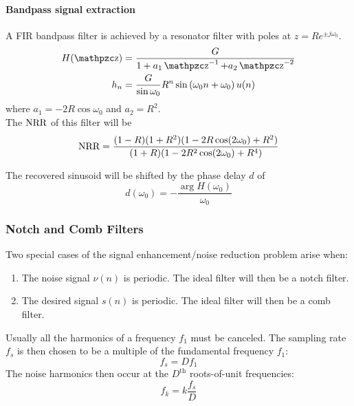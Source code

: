\paragraph{Bandpass signal extraction}
A FIR bandpass filter is achieved by a resonator filter with poles at $z = R e^{\pm j \omega_0}$.
\begin{align*}
	H(\z) &= \frac{G}{1 + a_1 \z^{-1} + a_2 \z^{-2}} \\ 
	h_n &= \frac{G}{\sin \omega_0} R^n \sin\left(\omega_0 n + \omega_0\right) u(n)
\end{align*}
where $a_1 = -2R \cos\omega_0$ and $a_2 = R^2$. \\

The $\operatorname{\text{NRR}}$ of this filter will be
\begin{equation*}
	\operatorname{\text{NRR}}= \frac{(1-R)(1+R^2)(1-2R\cos(2\omega_0)+R^2)}{(1+R)(1-2R^2\cos(2\omega_0)+R^4)}
\end{equation*}

The recovered sinusoid will be shifted by the phase delay $d$ of
\begin{equation*}
	d(\omega_0) = - \frac{\arg H(\omega_0)}{\omega_0}
\end{equation*}

\newpage
\subsubsection{Notch and Comb Filters}

Two special cases of the signal enhancement/noise reduction problem arise when:
\begin{enumerate}
	\item The noise signal $\nu(n)$ is periodic. The ideal filter will then 
	be a notch filter.
	\item The desired signal $s(n)$ is periodic. The ideal filter will then
	be a comb filter.
\end{enumerate} 

Usually all the harmonics of a frequency $f_1$ must be canceled.
The sampling rate $f_s$ is then chosen to be a multiple of the fundamental
frequency $f_1$: 
\begin{equation*}
	f_s = D f_1
\end{equation*}
The noise harmonics then occur at the $D^{\text{th}}$ roots-of-unit frequencies:
\begin{equation*}
	f_k = k \frac{f_s}{D}
\end{equation*}

